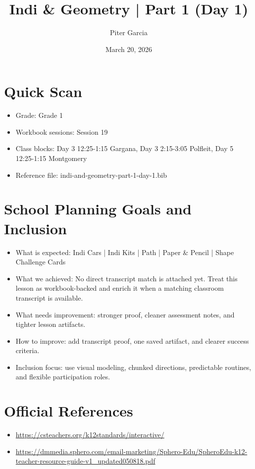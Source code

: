 \documentclass[11pt]{article}
\title{Indi & Geometry | Part 1 (Day 1)}
\author{Piter Garcia}
\date{March 20, 2026}
\begin{document}
    \maketitle
    \section*{Quick Scan}
    \begin{itemize}[leftmargin=*]
    \item Grade: Grade 1
    \item Workbook sessions: Session 19
    \item Class blocks: Day 3 12:25-1:15 Gargana, Day 3 2:15-3:05 Polfleit, Day 5 12:25-1:15 Montgomery
    \item Reference file: indi-and-geometry-part-1-day-1.bib
    \end{itemize}
    \section*{School Planning Goals and Inclusion}
    \begin{itemize}[leftmargin=*]
    \item What is expected: Indi Cars | Indi Kits | Path | Paper & Pencil | Shape Challenge Cards
    \item What we achieved: No direct transcript match is attached yet. Treat this lesson as workbook-backed and enrich it when a matching classroom transcript is available.
    \item What needs improvement: stronger proof, cleaner assessment notes, and tighter lesson artifacts.
    \item How to improve: add transcript proof, one saved artifact, and clearer success criteria.
    \item Inclusion focus: use visual modeling, chunked directions, predictable routines, and flexible participation roles.
    \end{itemize}
    \section*{Official References}
    \begin{itemize}[leftmargin=*]
    \item \url{https://csteachers.org/k12standards/interactive/}
\item \url{https://dmmedia.sphero.com/email-marketing/Sphero-Edu/SpheroEdu-k12-teacher-resource-guide-v1_updated050818.pdf}

    \end{itemize}
    
\end{document}
